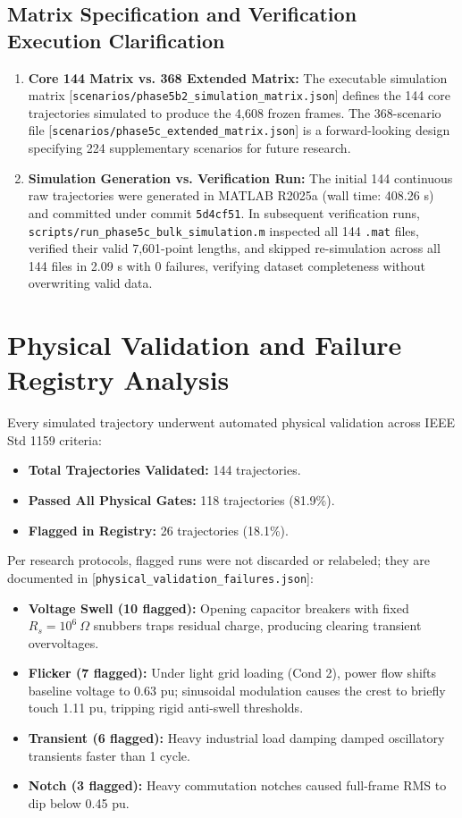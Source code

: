\documentclass[12pt,a4paper]{report}
\begin{document}
\subsection{Matrix Specification and Verification Execution Clarification}
\begin{enumerate}
    \item \textbf{Core 144 Matrix vs. 368 Extended Matrix:} The executable simulation matrix [\texttt{scenarios/phase5b2\_simulation\_matrix.json}] defines the 144 core trajectories simulated to produce the 4,608 frozen frames. The 368-scenario file [\texttt{scenarios/phase5c\_extended\_matrix.json}] is a forward-looking design specifying 224 supplementary scenarios for future research.
    \item \textbf{Simulation Generation vs. Verification Run:} The initial 144 continuous raw trajectories were generated in MATLAB R2025a (wall time: 408.26 s) and committed under commit \texttt{5d4cf51}. In subsequent verification runs, \texttt{scripts/run\_phase5c\_bulk\_simulation.m} inspected all 144 \texttt{.mat} files, verified their valid 7,601-point lengths, and skipped re-simulation across all 144 files in 2.09 s with 0 failures, verifying dataset completeness without overwriting valid data.
\end{enumerate}

\section{Physical Validation and Failure Registry Analysis}
\label{sec:dataset_freeze}
Every simulated trajectory underwent automated physical validation across IEEE Std 1159 criteria:
\begin{itemize}
    \item \textbf{Total Trajectories Validated:} 144 trajectories.
    \item \textbf{Passed All Physical Gates:} 118 trajectories (81.9\%).
    \item \textbf{Flagged in Registry:} 26 trajectories (18.1\%).
\end{itemize}
Per research protocols, flagged runs were not discarded or relabeled; they are documented in [\texttt{physical\_validation\_failures.json}]:
\begin{itemize}
    \item \textbf{Voltage Swell (10 flagged):} Opening capacitor breakers with fixed $R_s = 10^6\ \Omega$ snubbers traps residual charge, producing clearing transient overvoltages.
    \item \textbf{Flicker (7 flagged):} Under light grid loading (Cond 2), power flow shifts baseline voltage to 0.63 pu; sinusoidal modulation causes the crest to briefly touch 1.11 pu, tripping rigid anti-swell thresholds.
    \item \textbf{Transient (6 flagged):} Heavy industrial load damping damped oscillatory transients faster than 1 cycle.
    \item \textbf{Notch (3 flagged):} Heavy commutation notches caused full-frame RMS to dip below 0.45 pu.
\end{itemize}
\end{document}
